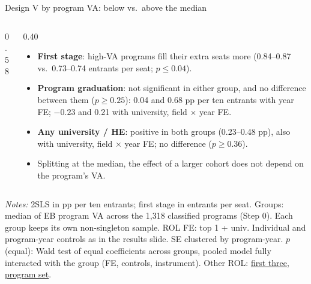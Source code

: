 \documentclass{beamer}
\begin{document}
\begin{frame}[label=d5-va-median]{Design V by program VA: below vs.\ above the median}
\begin{columns}[T,onlytextwidth]
\begin{column}{0.58\textwidth}
\centering
\tiny
\resizebox{\linewidth}{!}{}
\end{column}
\begin{column}{0.40\textwidth}
\scriptsize
\begin{itemize}
    \setlength{\itemsep}{3pt}
    \item \textbf{First stage}: high-VA programs fill their extra seats more (0.84--0.87 vs.\ 0.73--0.74 entrants per seat; $p\leq0.04$).
    \item \textbf{Program graduation}: not significant in either group, and no difference between them ($p\geq0.25$): 0.04 and 0.68 pp per ten entrants with year FE; $-0.23$ and 0.21 with university, field $\times$ year FE.
    \item \textbf{Any university / HE}: positive in both groups (0.23--0.48 pp), also with university, field $\times$ year FE; no difference ($p\geq0.36$).
    \item Splitting at the median, the effect of a larger cohort does not depend on the program's VA.
\end{itemize}
\end{column}
\end{columns}

\vspace{0.05cm}
\parbox{0.97\textwidth}{\tiny \textit{Notes:} 2SLS in pp per ten entrants; first stage in entrants per seat. Groups: median of EB program VA across the 1,318 classified programs (Step 0). Each group keeps its own non-singleton sample. ROL FE: top 1 + univ. Individual and program-year controls as in the results slide. SE clustered by program-year. $p$ (equal): Wald test of equal coefficients across groups, pooled model fully interacted with the group (FE, controls, instrument). Other ROL: \hyperlink{d5-app-va-median-top3}{\color{blue}first three}, \hyperlink{d5-app-va-median-set}{\color{blue}program set}.}
\end{frame}
\end{document}
